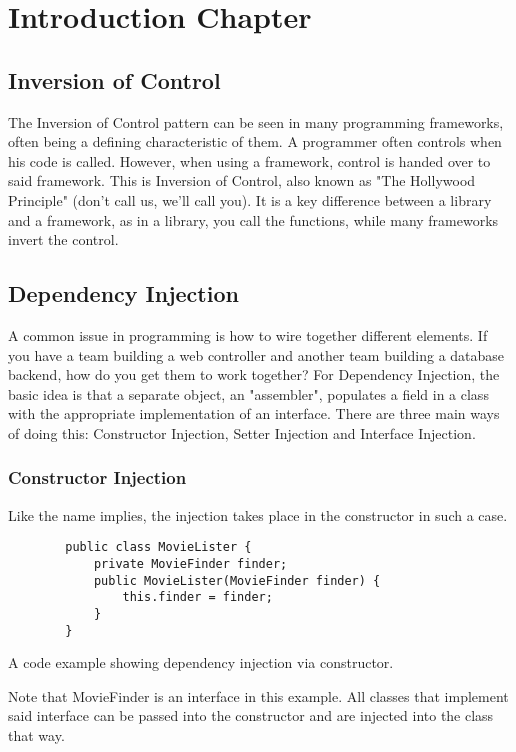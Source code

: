 \chapter{Introduction Chapter}\label{ch:intro-chapter}
\section{Inversion of Control}\label{sec:inv-of-control}
The Inversion of Control pattern can be seen in many programming frameworks, often being a defining characteristic of them.
A programmer often controls when his code is called.
However, when using a framework, control is handed over to said framework.
This is Inversion of Control, also known as "The Hollywood Principle" (don't call us, we'll call you).
It is a key difference between a library and a framework, as in a library, you call the functions, while many frameworks invert the control.\parencite{fowler_bliki_2005}
\newline
\section{Dependency Injection}\label{sec:dep-injection}
A common issue in programming is how to wire together different elements.
If you have a team building a web controller and another team building a database backend, how do you get them to work together?
For Dependency Injection, the basic idea is that a separate object, an "assembler", populates a field in a class with the appropriate implementation of an interface.
There are three main ways of doing this: Constructor Injection, Setter Injection and Interface Injection.
\subsection{Constructor Injection}\label{subsec:cons-injection}
Like the name implies, the injection takes place in the constructor in such a case.
\begin{longlisting}
    \begin{verbatim}
        public class MovieLister {
            private MovieFinder finder;
            public MovieLister(MovieFinder finder) {
                this.finder = finder;
            }
        }
    \end{verbatim}
    \caption[Dependency Injection Example]{A code example showing dependency injection via constructor.}
    \label{lst:ci-example}
\end{longlisting}
Note that MovieFinder is an interface in this example.
All classes that implement said interface can be passed into the constructor and are injected into the class that way.\parencite{fowler_inversion_2004}

